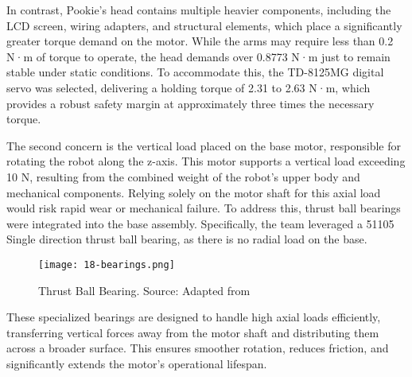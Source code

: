 In contrast, Pookie’s head contains multiple heavier components, including the LCD screen, wiring adapters, and structural elements, which place a significantly greater torque demand on the motor. While the arms may require less than 0.2 N·m of torque to operate, the head demands over 0.8773 N·m just to remain stable under static conditions. To accommodate this, the TD-8125MG digital servo was selected, delivering a holding torque of 2.31 to 2.63 N·m, which provides a robust safety margin at approximately three times the necessary torque.

The second concern is the vertical load placed on the base motor, responsible for rotating the robot along the z-axis. This motor supports a vertical load exceeding 10 N, resulting from the combined weight of the robot’s upper body and mechanical components. Relying solely on the motor shaft for this axial load would risk rapid wear or mechanical failure. To address this, thrust ball bearings were integrated into the base assembly. Specifically, the team leveraged a 51105 Single direction thrust ball bearing, as there is no radial load on the base.

\begin{figure}[!ht]
    \centering
    \texttt{[image: 18-bearings.png]}
    \captionsetup{justification=centering}
    \caption{Thrust Ball Bearing. Source: Adapted from \cite{Olaru_2016}}
    \label{fig:18-bearings}
\end{figure}

These specialized bearings are designed to handle high axial loads efficiently, transferring vertical forces away from the motor shaft and distributing them across a broader surface. This ensures smoother rotation, reduces friction, and significantly extends the motor’s operational lifespan.


